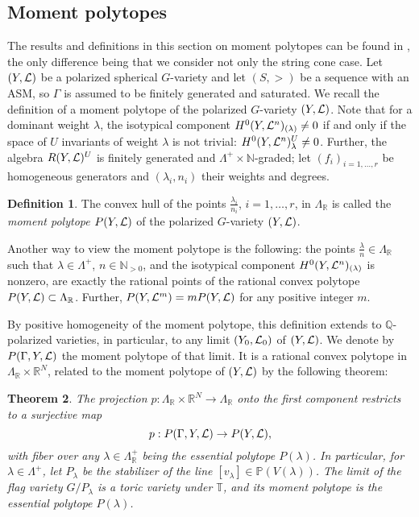 \documentclass{emsprocart}
\newtheorem{theorem}{Theorem}[section]
\theoremstyle{definition}
\newtheorem{definition}[theorem]{Definition}
\begin{document}
\subsection{Moment polytopes}
The results and definitions in this section on moment polytopes can be found in \cite{AB}, the only
difference being that we consider not only the string cone case.
Let $(Y,\cal L)$ be a  polarized spherical $G$-variety and let
$(S,>)$ be a sequence with an ASM,
so $\Gamma$ is assumed to be finitely generated and saturated.
We recall the definition of a moment polytope of the polarized $G$-variety $(Y,\cal L)$.
Note that for a dominant weight $\lambda$, the isotypical component $H^0(Y ,{\cal L}^{n})_{(\lambda)} \not= 0$
if and only if the space of $U$ invariants of weight $\lambda$ is not trivial: $H^0(Y,{\cal L}^n)^U_\lambda \not=0$.
Further, the algebra $R(Y,{\cal L})^U$ is finitely generated and $\Lambda^+\times\mathbb N$-graded;
let $(f_i)_{i=1,\ldots,r}$ be homogeneous
generators and $(\lambda_i, n_i)$ their weights and degrees.

\begin{definition}
The convex hull  of the points $\frac{\lambda_i}{n_i}$, $i=1,\ldots,r$, in $\Lambda_{\mathbb R}$
is called the {\it moment polytope $P(Y,\cal L)$} of the polarized $G$-variety $(Y,\cal L)$.
\end{definition}
Another way to view the moment polytope is the following: the points $\frac{\lambda}{n}\in\Lambda_{\mathbb R}$
such that $\lambda\in\Lambda^+$, $n\in\mathbb N_{>0}$, and the isotypical component $H^0(Y,{\cal L}^n)_{(\lambda)}$
is nonzero, are exactly the rational points of the rational convex polytope $P(Y,{\cal L})\subset \Lambda_{\mathbb R}$.
Further,  $P(Y,{\cal L}^m) = mP(Y,{\cal L})$ for any positive integer $m$.

By positive homogeneity of the moment polytope, this definition extends to
$\mathbb Q$-polarized varieties, in particular, to any limit $(Y_0,{\cal L}_0)$ of $(Y,{\cal L})$.
We denote by $P(\Gamma,Y,{\cal L})$ the moment polytope of that limit. It is a rational convex polytope in
$\Lambda_{\mathbb R}\times \mathbb R^N$, related to the moment polytope of $(Y,{\cal L})$ by the following theorem:

\begin{theorem}\label{polytopethm}\it
The projection $p : \Lambda_{\mathbb R}\times \mathbb R^N \rightarrow \Lambda_{\mathbb R}$ onto the first component
restricts to a surjective map
$$
p : P(\Gamma,Y,{\cal L}) \rightarrow P(Y,{\cal L}),
$$
with fiber over any $\lambda\in\Lambda^+_{\mathbb R}$
being the essential polytope $P(\lambda)$. In particular, for $\lambda\in\Lambda^+$, let
$P_\lambda$ be the stabilizer  of the line $[v_\lambda]\in \mathbb P(V(\lambda))$.
The limit of the flag variety $G/P_\lambda$ is a toric variety under $\mathbb T$, and its
moment polytope is the essential polytope $P(\lambda)$.
\end{theorem}
\end{document}

